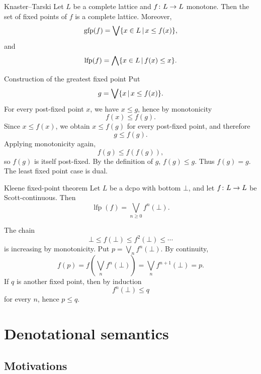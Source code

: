 \documentclass[a4paper]{article}
\newcommand{\lfp}{\operatorname{lfp}}
\newcommand{\gfp}{\operatorname{gfp}}
\begin{document}
\begin{snippettheorem}{Knaster--Tarski}
    Let \(L\) be a complete lattice and \(f\colon L\to L\) monotone.
    Then the set of fixed points of \(f\) is a complete lattice. Moreover,
    \[
        \gfp(f)
        =
        \bigvee\{x\in L\suchthat x\leq f(x)\},
    \]
    and
    \[
        \lfp(f)
        =
        \bigwedge\{x\in L\suchthat f(x)\leq x\}.
    \]
\end{snippettheorem}

\begin{snippetproof}{Construction of the greatest fixed point}
    Put
    \[
        g=\bigvee\{x\,|\, x\leq f(x)\}.
    \]
    For every post-fixed point \(x\), we have \(x\leq g\), hence by monotonicity
    \[
        f(x)\leq f(g).
    \]
    Since \(x\leq f(x)\), we obtain \(x\leq f(g)\) for every post-fixed point, and therefore
    \[
        g\leq f(g).
    \]
    Applying monotonicity again,
    \[
        f(g)\leq f(f(g)),
    \]
    so \(f(g)\) is itself post-fixed. By the definition of \(g\), \(f(g)\leq g\).
    Thus \(f(g)=g\).
    The least fixed point case is dual.
\end{snippetproof}

\begin{snippettheorem}{Kleene fixed-point theorem}
    Let \(L\) be a dcpo with bottom \(\bot\), and let \(f\colon L\to L\) be Scott-continuous.
    Then
    \[
        \lfp(f)
        =
        \bigvee_{n\geq0}f^n(\bot).
    \]
\end{snippettheorem}

\begin{snippetproof}{}
    The chain
    \[
        \bot\leq f(\bot)\leq f^2(\bot)\leq\cdots
    \]
    is increasing by monotonicity.
    Put \(p=\bigvee_n f^n(\bot)\). By continuity,
    \[
        f(p)
        =
        f\left(\bigvee_n f^n(\bot)\right)
        =
        \bigvee_n f^{n+1}(\bot)
        =p.
    \]
    If \(q\) is another fixed point, then by induction
    \[
        f^n(\bot)\leq q
    \]
    for every \(n\), hence \(p\leq q\).
\end{snippetproof}

\section{Denotational semantics}

\subsection{Motivations}
\end{document}
